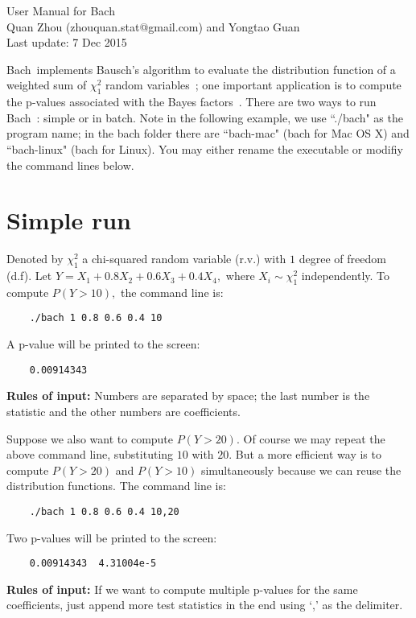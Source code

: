 \documentclass[11pt, Palatino]{article}
\def\bach{{\sc Bach}~}
\begin{document}
\begin{center}
{\huge User Manual for \bach} \\
\vspace{0.5cm}
{\large Quan Zhou (zhouquan.stat@gmail.com) and Yongtao Guan} \\
\vspace{0.2cm}
{\large Last update: 7 Dec 2015} \\
\end{center}

\bach implements Bausch's algorithm to evaluate the distribution function of a weighted sum of $\chi_1^2$ random variables~\cite{bausch2013efficient}; one important application is to compute the p-values associated with the Bayes factors~\cite{quan.guan.2015}.  There are two ways to run \bach: simple or in batch. 
Note in the following example, we use ``./bach" as the program name; in the bach folder  there are ``bach-mac" (bach for Mac OS X) and ``bach-linux" (bach for Linux). You may either rename the executable or modifiy the command lines below.  
 
\section{Simple run}
Denoted by $\chi_1^2$ a chi-squared random variable (r.v.) with $1$ degree of freedom (d.f).  Let
$Y =  X_1 + 0.8 X_2 + 0.6 X_3 + 0.4 X_4,$
where $X_i\sim \chi_1^2$ independently. 
To compute $P(Y > 10),$ the command line is: 
\begin{verbatim}
	./bach 1 0.8 0.6 0.4 10
\end{verbatim}
A p-value will be printed to the screen:
\begin{verbatim}
	0.00914343 
\end{verbatim} 
\textbf{Rules of input:} Numbers are separated by space; the last number is the statistic and the other numbers are coefficients. 

\medskip
Suppose we also want to compute $P(Y>20)$. Of course we may repeat the above command line, substituting $10$ with $20.$ 
But a more efficient way is to compute $P(Y>20)$ and $P(Y>10)$ simultaneously because we can reuse the distribution functions.  
The command line is: 
\begin{verbatim}
	./bach 1 0.8 0.6 0.4 10,20
\end{verbatim}
Two p-values will be printed to the screen:
\begin{verbatim}
	0.00914343  4.31004e-5
\end{verbatim} 
\textbf{Rules of input:} If we want to compute multiple p-values for the same coefficients, just append more test statistics in the end using `,' as the delimiter. 
 
\end{document}
